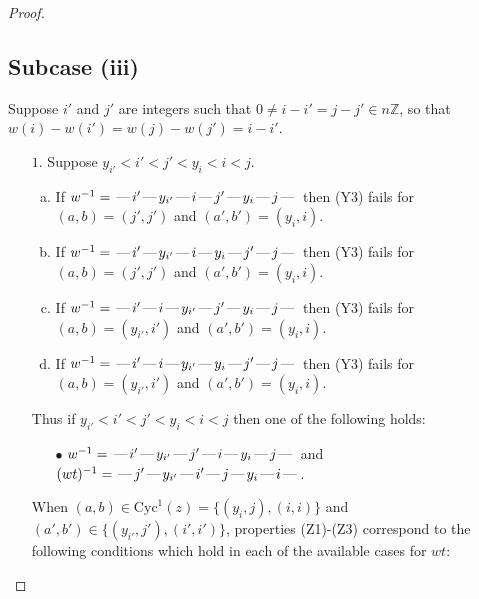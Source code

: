 \documentclass[10pt]{article}
\theoremstyle{definition}
\theoremstyle{definition}
\def\dash{\text{\hspace{0.5mm}---\hspace{0.5mm}}}
\def\Cyc{\mathrm{Cyc}}
\def\ZZ{\mathbb{Z}}
\begin{document}
\begin{proof}
\subsection{Subcase (iii)}
Suppose $i'$ and $j'$ are integers such that
$0\neq i - i' = j - j' \in n\ZZ$,
so that $w(i) - w(i') = w(j) - w(j') = i - i'$.
\begin{enumerate}
\item[$1$.] Suppose $y_{i'} < i' < j' < y_i < i < j$.
\begin{enumerate}[(a)]
\item If $w^{-1} = \dash i'\dash y_{i'}\dash i\dash j'\dash y_i\dash j\dash $ then (Y3) fails for $(a,b)=(j',j')$ and $(a',b')=(y_i,i)$.
\item If $w^{-1} = \dash i'\dash y_{i'}\dash i\dash y_i\dash j'\dash j\dash $ then (Y3) fails for $(a,b)=(j',j')$ and $(a',b')=(y_i,i)$.
\item If $w^{-1} = \dash i'\dash i\dash y_{i'}\dash j'\dash y_i\dash j\dash $ then (Y3) fails for $(a,b)=(y_{i'},i')$ and $(a',b')=(y_i,i)$.
\item If $w^{-1} = \dash i'\dash i\dash y_{i'}\dash y_i\dash j'\dash j\dash $ then (Y3) fails for $(a,b)=(y_{i'},i')$ and $(a',b')=(y_i,i)$.
\end{enumerate}
Thus if $y_{i'} < i' < j' < y_i < i < j$ then one of the following holds:
\begin{enumerate}
\item[$\bullet$] $w^{-1} = \dash i'\dash y_{i'}\dash j'\dash i\dash y_i\dash j\dash $ and $(wt)^{-1} = \dash j'\dash y_{i'}\dash i'\dash j\dash y_i\dash i\dash $.
\end{enumerate}
When $(a,b)\in\Cyc^1(z)=\{(y_i,j),(i,i)\}$ and $(a',b')\in\{(y_{i'},j'),(i',i')\}$,
properties (Z1)-(Z3) correspond to the following conditions which
hold in each of the available cases for $wt$:
\end{enumerate}
\end{proof}
\end{document}
